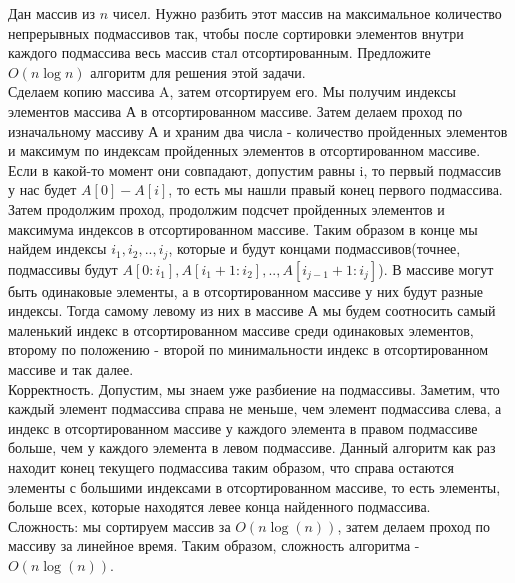 \documentclass[12pt]{extreport}
\theoremstyle{definiton}
\theoremstyle{definition}
\theoremstyle{definition}
\begin{document}
\Pr[6] Дан массив из $n$ чисел. Нужно разбить этот массив на максимальное количество непрерывных подмассивов так, чтобы после сортировки элементов внутри каждого подмассива весь массив стал отсортированным. Предложите $O(n\log n)$ алгоритм для решения этой задачи.
\newline
\\ Сделаем копию массива A, затем отсортируем его. Мы получим индексы элементов массива А в отсортированном массиве. Затем делаем проход по изначальному массиву А и храним два числа - количество пройденных элементов и максимум по индексам пройденных элементов в отсортированном массиве. Если в какой-то момент они совпадают, допустим равны i, то первый подмассив у нас будет $A[0]-A[i]$, то есть мы нашли правый конец первого подмассива. Затем продолжим проход, продолжим подсчет пройденных элементов и максимума индексов в отсортированном массиве. Таким образом в конце мы найдем индексы $i_1, i_2, .., i_j$, которые и будут концами подмассивов(точнее, подмассивы будут $A[0:i_1],A[i_1+1:i_2],..,A[i_{j-1}+1:i_j]$). В массиве могут быть одинаковые элементы, а в отсортированном массиве у них будут разные индексы. Тогда самому левому из них в массиве А мы будем соотносить самый маленький индекс в отсортированном массиве среди одинаковых элементов, второму по положению - второй по минимальности индекс в отсортированном массиве и так далее.
\\Корректность. Допустим, мы знаем уже разбиение на подмассивы. Заметим, что каждый элемент подмассива справа не меньше, чем элемент подмассива слева, а индекс в отсортированном массиве у каждого элемента в правом подмассиве больше, чем у каждого элемента в левом подмассиве. Данный алгоритм как раз находит конец текущего подмассива таким образом, что справа остаются элементы с большими индексами в отсортированном массиве, то есть элементы, больше всех, которые находятся левее конца найденного подмассива.
\\Сложность: мы сортируем массив за $O(n\log(n))$, затем делаем проход по массиву за линейное время. Таким образом, сложность алгоритма - $O(n\log(n))$.
\end{document}
